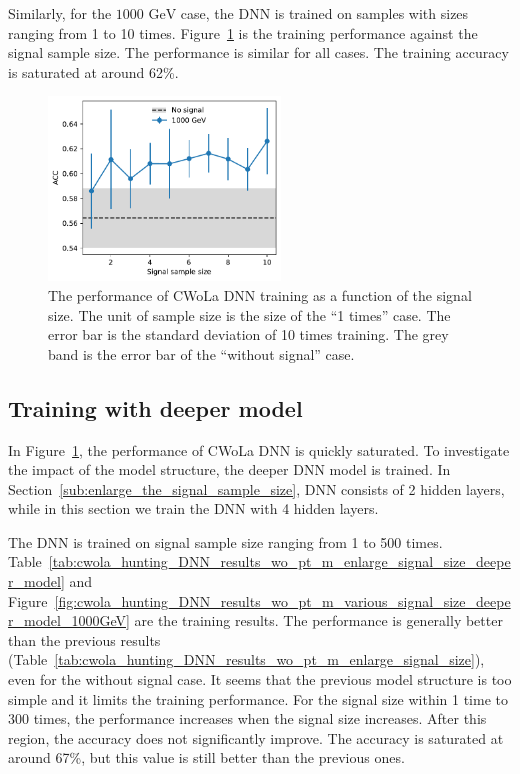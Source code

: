 \documentclass[12pt]{article}
\begin{document}
		Similarly, for the $\text{1000 GeV}$ case, the DNN is trained on samples with sizes ranging from 1 to 10 times. Figure~\ref{fig:cwola_hunting_DNN_results_wo_pt_m_various_signal_size_1000GeV} is the training performance against the signal sample size. The performance is similar for all cases. The training accuracy is saturated at around 62\%.
		\begin{figure}[htpb]
			\centering
			\includegraphics[width=0.55\textwidth]{ACC_vs_signal_sample_size-1000GeV.pdf}
			\caption{The performance of CWoLa DNN training as a function of the signal size. The unit of sample size is the size of the ``1 times'' case. The error bar is the standard deviation of 10 times training. The grey band is the error bar of the ``without signal'' case.}
			\label{fig:cwola_hunting_DNN_results_wo_pt_m_various_signal_size_1000GeV}
		\end{figure}

	\subsection{Training with deeper model}%
	\label{sub:training_with_deeper_model}
		In Figure~\ref{fig:cwola_hunting_DNN_results_wo_pt_m_various_signal_size_1000GeV}, the performance of CWoLa DNN is quickly saturated. To investigate the impact of the model structure, the deeper DNN model is trained. In Section~\ref{sub:enlarge_the_signal_sample_size}, DNN consists of 2 hidden layers, while in this section we train the DNN with 4 hidden layers.

		The DNN is trained on signal sample size ranging from 1 to 500 times. Table~\ref{tab:cwola_hunting_DNN_results_wo_pt_m_enlarge_signal_size_deeper_model} and Figure~\ref{fig:cwola_hunting_DNN_results_wo_pt_m_various_signal_size_deeper_model_1000GeV} are the training results. The performance is generally better than the previous results (Table~\ref{tab:cwola_hunting_DNN_results_wo_pt_m_enlarge_signal_size}), even for the without signal case. It seems that the previous model structure is too simple and it limits the training performance. For the signal size within 1 time to 300 times, the performance increases when the signal size increases. After this region, the accuracy does not significantly improve. The accuracy is saturated at around 67\%, but this value is still better than the previous ones.
\end{document}
